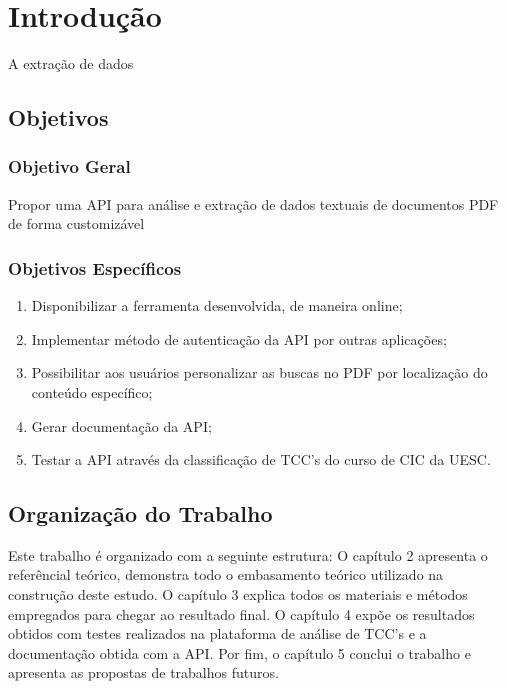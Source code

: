 \chapter{Introdução}

A extração de dados

\section{Objetivos}

\subsection{ Objetivo Geral}
    Propor uma API para análise e extração de dados textuais de documentos PDF de forma customizável

\subsection{Objetivos Específicos}
\begin{enumerate}
\item Disponibilizar a ferramenta desenvolvida, de maneira online;

\item Implementar método de autenticação da API por outras aplicações;

\item Possibilitar aos usuários personalizar as buscas no PDF por localização do conteúdo específico;

\item Gerar documentação da API;

\item Testar a API através da classificação de TCC's do curso de CIC da UESC.

\end{enumerate}

\section{Organização do Trabalho}
Este trabalho é organizado com a seguinte estrutura: O capítulo 2 apresenta o referêncial teórico, demonstra todo o embasamento teórico utilizado na construção deste estudo. O capítulo 3 explica todos os materiais e métodos empregados para chegar ao resultado final. O capítulo 4 expõe os resultados obtidos com testes realizados na plataforma de análise de TCC's e a documentação obtida com a API. Por fim, o capítulo 5 conclui o trabalho e apresenta as propostas de trabalhos futuros.
